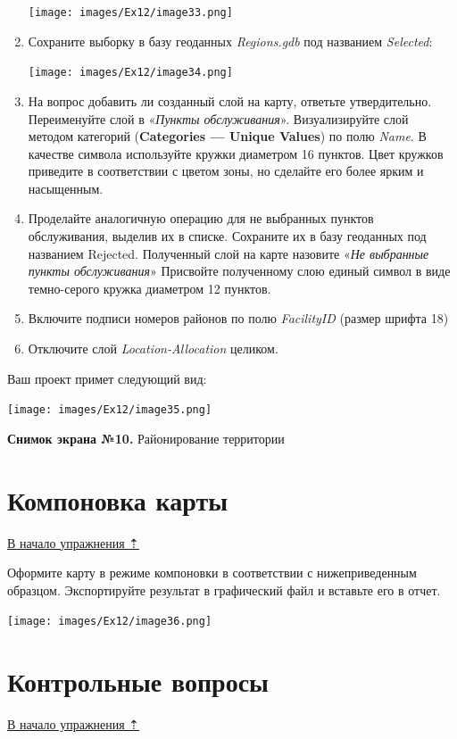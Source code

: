 \documentclass[12pt,]{book}
\begin{document}
\begin{enumerate}
  \texttt{[image: images/Ex12/image33.png]}
\item
  Сохраните выборку в базу геоданных \emph{Regions.gdb} под названием
  \emph{Selected}:

  \texttt{[image: images/Ex12/image34.png]}
\item
  На вопрос добавить ли созданный слой на карту, ответьте утвердительно. Переименуйте слой в «\emph{Пункты обслуживания}». Визуализируйте слой методом категорий (\textbf{Categories --- Unique Values}) по полю \emph{Name}. В качестве символа используйте кружки диаметром 16 пунктов. Цвет кружков приведите в соответствии с цветом зоны, но сделайте его более ярким и насыщенным.
\item
  Проделайте аналогичную операцию для не выбранных пунктов обслуживания, выделив их в списке. Сохраните их в базу геоданных под названием Rejected. Полученный слой на карте назовите «\emph{Не выбранные пункты обслуживания}» Присвойте полученному слою единый символ в виде темно-серого кружка диаметром 12 пунктов.
\item
  Включите подписи номеров районов по полю \emph{FacilityID} (размер шрифта 18)
\item
  Отключите слой \emph{Location-Allocation} целиком.
\end{enumerate}

Ваш проект примет следующий вид:

\texttt{[image: images/Ex12/image35.png]}

\textbf{Снимок экрана №10.} Районирование территории

\hypertarget{network-analysis-layout}{%
\section{Компоновка карты}\label{network-analysis-layout}}

\protect\hyperlink{network-analysis}{В начало упражнения ⇡}

Оформите карту в режиме компоновки в соответствии с нижеприведенным образцом. Экспортируйте результат в графический файл и вставьте его в отчет.

\texttt{[image: images/Ex12/image36.png]}

\hypertarget{network-analysis-questions}{%
\section{Контрольные вопросы}\label{network-analysis-questions}}

\protect\hyperlink{network-analysis}{В начало упражнения ⇡}
\end{document}

